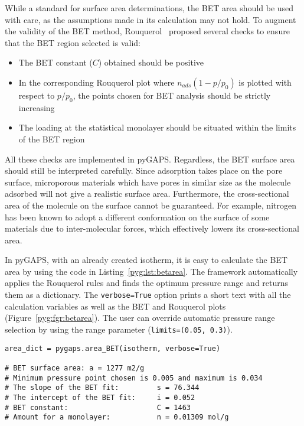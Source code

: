 While a standard for surface area determinations, the BET area
should be used with care, as the assumptions made in
its calculation may not hold. To augment the validity of the BET
method, Rouquerol~\cite{rouquerolAdsorptionPowdersPorous2013} proposed
several checks to ensure that the BET region selected is valid:

\begin{itemize}

	\item The BET constant (\(C\)) obtained should be positive
    \item In the corresponding Rouquerol plot where \(n_{ads}(1-p/p_0)\)
    is plotted with respect to \(p/p_0\), the points chosen for BET
	analysis should be strictly increasing
	\item The loading at the statistical monolayer should be
	situated within the limits of the BET region

\end{itemize}

All these checks are implemented in pyGAPS.
Regardless, the BET surface area should still be interpreted carefully.
Since adsorption takes place on the pore surface, microporous materials
which have pores in similar size as the molecule adsorbed will not
give a realistic surface area. Furthermore, the cross-sectional area
of the molecule on the surface cannot be guaranteed. For example, 
nitrogen has been known to adopt a different conformation on the surface
of some materials due to inter-molecular forces, which effectively
lowers its cross-sectional area.

In pyGAPS, with an already created isotherm, it is easy to 
calculate the BET area by using the code in Listing~\ref{pyg:lst:betarea}.
The framework automatically applies the Rouquerol rules and 
finds the optimum pressure range and returns them as a 
dictionary. The \lstinline{verbose=True} option prints a short
text with all the calculation variables as well as the BET and Rouquerol 
plots (Figure~\ref{pyg:fgr:betarea}). The user can override 
automatic pressure range selection by using the range parameter
(\lstinline{limits=(0.05, 0.3)}).

\begin{lstlisting}[caption={Calculating a BET area},label={pyg:lst:betarea}]
area_dict = pygaps.area_BET(isotherm, verbose=True)

# BET surface area: a = 1277 m2/g
# Minimum pressure point chosen is 0.005 and maximum is 0.034
# The slope of the BET fit: 		s = 76.344
# The intercept of the BET fit: 	i = 0.052
# BET constant: 					C = 1463
# Amount for a monolayer: 			n = 0.01309 mol/g
\end{lstlisting}

